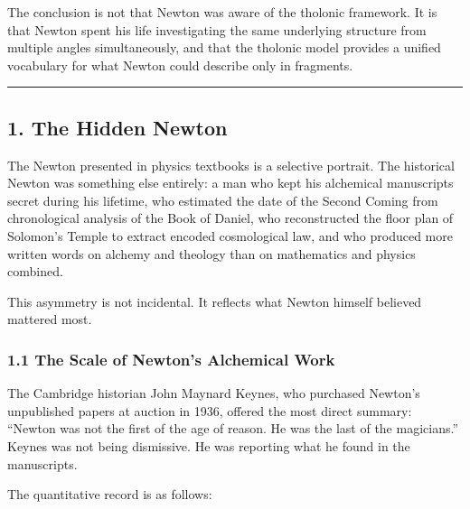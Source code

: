 \documentclass[
  11pt,
  letterpaper,
]{article}
\begin{document}
The conclusion is not that Newton was aware of the tholonic framework.
It is that Newton spent his life investigating the same underlying
structure from multiple angles simultaneously, and that the tholonic
model provides a unified vocabulary for what Newton could describe only
in fragments.

\begin{center}\rule{0.5\linewidth}{0.5pt}\end{center}

\subsection{1. The Hidden Newton}\label{the-hidden-newton}

The Newton presented in physics textbooks is a selective portrait. The
historical Newton was something else entirely: a man who kept his
alchemical manuscripts secret during his lifetime, who estimated the
date of the Second Coming from chronological analysis of the Book of
Daniel, who reconstructed the floor plan of Solomon's Temple to extract
encoded cosmological law, and who produced more written words on alchemy
and theology than on mathematics and physics combined.

This asymmetry is not incidental. It reflects what Newton himself
believed mattered most.

\subsubsection{1.1 The Scale of Newton's Alchemical
Work}\label{the-scale-of-newtons-alchemical-work}

The Cambridge historian John Maynard Keynes, who purchased Newton's
unpublished papers at auction in 1936, offered the most direct summary:
``Newton was not the first of the age of reason. He was the last of the
magicians.'' Keynes was not being dismissive. He was reporting what he
found in the manuscripts.

The quantitative record is as follows:
\end{document}
